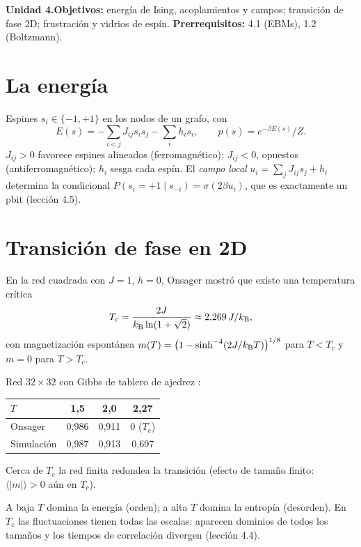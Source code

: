 \documentclass[11pt,a4paper]{article}
\begin{document}

\noindent\textbf{Unidad 4.}\quad\textbf{Objetivos:} energía de Ising, acoplamientos y campos; transición de fase 2D; frustración y vidrios de espín.
\textbf{Prerrequisitos:} 4.1 (EBMs), 1.2 (Boltzmann).

\section{La energía}
Espines $s_i\in\{-1,+1\}$ en los nodos de un grafo, con
\begin{equation}
E(s)=-\sum_{i<j}J_{ij}s_is_j-\sum_ih_is_i,\qquad p(s)=e^{-\beta E(s)}/Z.
\end{equation}
$J_{ij}>0$ favorece espines alineados (ferromagnético); $J_{ij}<0$, opuestos (antiferromagnético); $h_i$ sesga cada espín. El \emph{campo local}
$u_i=\sum_jJ_{ij}s_j+h_i$ determina la condicional $P(s_i=+1\mid s_{-i})=\sigma(2\beta u_i)$, que es exactamente un pbit (lección 4.5).

\section{Transición de fase en 2D}
En la red cuadrada con $J=1$, $h=0$, Onsager mostró que existe una temperatura crítica
\begin{equation}
T_c=\frac{2J}{k_{\mathrm B}\ln(1+\sqrt2)}\approx2{,}269\,J/k_{\mathrm B},
\end{equation}
con magnetización espontánea $m(T)=\big(1-\sinh^{-4}(2J/k_{\mathrm B} T)\big)^{1/8}$ para $T<T_c$ y $m=0$ para $T>T_c$.
\begin{ejemplo}
Red $32\times32$ con Gibbs de tablero de ajedrez \evS:
\begin{center}\begin{tabular}{lccc}\toprule
$T$ & 1,5 & 2,0 & 2,27\\\midrule
Onsager & 0,986 & 0,911 & $0$ ($T_c$)\\
Simulación & 0,987 & 0,913 & 0,697\\\bottomrule\end{tabular}\end{center}
Cerca de $T_c$ la red finita redondea la transición (efecto de tamaño finito: $\langle|m|\rangle>0$ aún en $T_c$).
\end{ejemplo}
\begin{intuicion}
A baja $T$ domina la energía (orden); a alta $T$ domina la entropía (desorden). En $T_c$ las fluctuaciones tienen todas las escalas: aparecen
dominios de todos los tamaños y los tiempos de correlación divergen (lección 4.4).
\end{intuicion}
\end{document}
